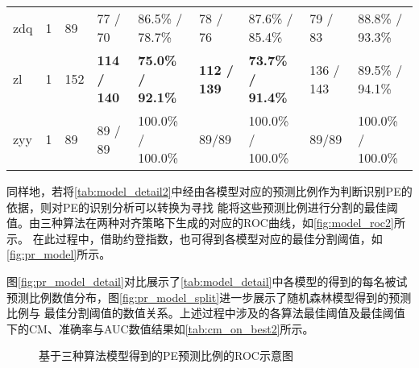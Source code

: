 \begin{center}
\begin{longtable}{m{1cm}<{\centering}m{1cm}<{\centering}m{1cm}<{\centering}m{1.5cm}<{\centering}m{2cm}<{\centering}m{1.5cm}<{\centering}m{2cm}<{\centering}m{1.5cm}<{\centering}m{2cm}<{\centering}}
             zdq       & 1           & 89                    & 77 / 70         & 86.5\% / 78.7\%     & 78 / 76         & 87.6\% / 85.4\%     & 79 / 83         & 88.8\% / 93.3\%                                       \\
             zl        & 1           & 152                   & \textbf{114 / 140}        & \textbf{75.0\% / 92.1\%}     & \textbf{112 / 139}         & \textbf{73.7\% / 91.4\%}     & 136 / 143        & 89.5\% / 94.1\%                                    \\
             zyy       & 1           & 89                    & 89 / 89         & 100.0\% / 100.0\%    & 89/89         & 100.0\% / 100.0\%    & 89/89         & 100.0\% / 100.0\%                                     \\    
      \end{longtable}
\end{center}
\vspace{-1.0cm} 

同样地，若将\autoref{tab:model_detail2}中经由各模型对应的预测比例作为判断识别PE的依据，则对PE的识别分析可以转换为寻找
能将这些预测比例进行分割的最佳阈值。由三种算法在两种对齐策略下生成的对应的ROC曲线，如\autoref{fig:model_roc2}所示。
在此过程中，借助约登指数，也可得到各模型对应的最佳分割阈值，如\autoref{fig:pr_model}所示。

图\autoref{fig:pr_model_detail}对比展示了\autoref{tab:model_detail}中各模型的得到的每名被试预测比例数值分布，图\autoref{fig:pr_model_split}进一步展示了随机森林模型得到的预测比例与
最佳分割阈值的数值关系。上述过程中涉及的各算法最佳阈值及最佳阈值下的CM、准确率与AUC数值结果如\autoref{tab:cm_on_best2}所示。

\begin{figure}[htbp]
      \centering
      \quad
      \caption{\label{fig:model_roc2}基于三种算法模型得到的PE预测比例的ROC示意图}
\end{figure}

